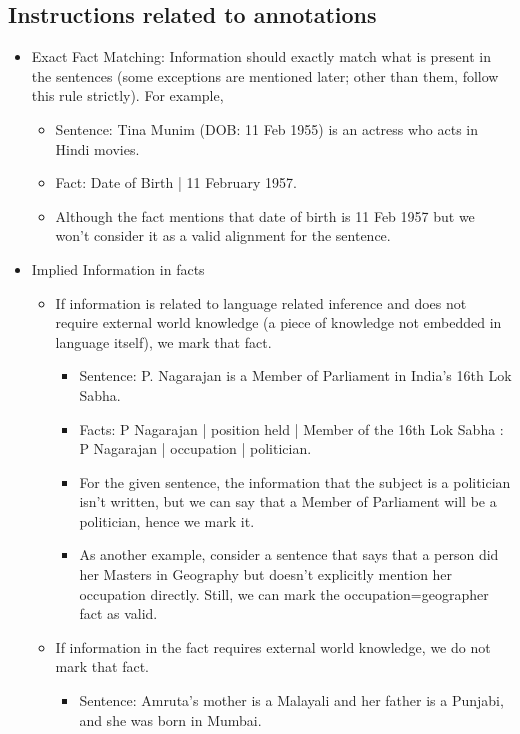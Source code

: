 \documentclass[11pt]{article}
\begin{document}
\subsection{Instructions related to annotations}
\begin{itemize}
\item  Exact Fact Matching: Information should exactly match what is present in the sentences (some exceptions are mentioned later; other than them, follow this rule strictly). For example, 
\begin{itemize}
\item Sentence: Tina Munim (DOB: 11 Feb 1955) is an actress who acts in Hindi movies.
\item Fact: Date of Birth | 11 February 1957. 
\item Although the fact mentions that date of birth is 11 Feb 1957 but we won't consider it as a valid alignment for the sentence.
\end{itemize}
\item Implied Information in facts
\begin{itemize}
\item If information is related to language related inference and does not require external world knowledge (a piece of knowledge not embedded in language itself), we mark that fact.
\begin{itemize}
\item Sentence: P. Nagarajan is a Member of Parliament in India's 16th Lok Sabha.
\item Facts:  P Nagarajan | position held | Member of the 16th Lok Sabha : P Nagarajan | occupation | politician.
\item For the given sentence, the information that the subject is a politician isn't written, but we can say that a Member of Parliament will be a politician, hence we mark it.
\item As another example, consider a sentence that says that a person did her Masters in Geography but doesn't explicitly mention her occupation directly. Still, we can mark the occupation=geographer fact as valid.
\end{itemize}
\end{itemize}
\begin{itemize}
\item If information in the fact requires external world knowledge, we do not mark that fact. 
\begin{itemize}
\item Sentence: Amruta's mother is a Malayali and her father is a Punjabi, and she was born in Mumbai.

\end{itemize}
\end{itemize}
\end{itemize}
\end{document}
